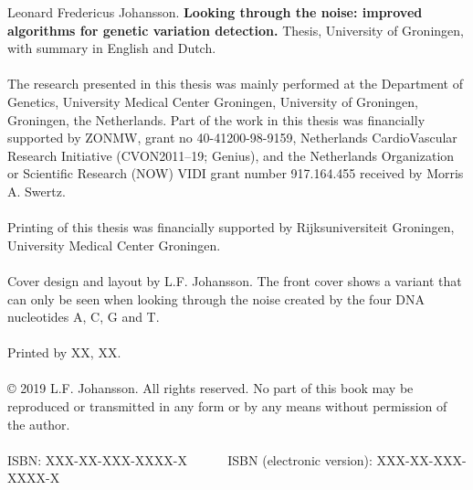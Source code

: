 {\small
\noindent
Leonard Fredericus Johansson. \textbf{Looking through the noise: improved algorithms for genetic variation detection.} Thesis, University of Groningen, with summary in English and Dutch.
\\~\\
The research presented in this thesis was mainly performed at the Department of Genetics, University Medical Center Groningen, University of Groningen, Groningen, the Netherlands. Part of the work in this thesis was financially supported by ZONMW, grant no 40-41200-98-9159, Netherlands CardioVascular Research Initiative (CVON2011–19; Genius), and the Netherlands Organization or Scientific Research (NOW) VIDI grant number 917.164.455 received by Morris A. Swertz. 
\\~\\
Printing of this thesis was financially supported by Rijksuniversiteit Groningen, University Medical Center Groningen. 
\\~\\
Cover design and layout by L.F. Johansson.
The front cover shows a variant that can only be seen when looking through the noise created by the four DNA nucleotides A, C, G and T. 
\\~\\
Printed by XX, XX.\\
\\
© 2019 L.F. Johansson. All rights reserved. No part of this book may be reproduced or transmitted in any form or by any means without permission of the author.\\
\\
ISBN: XXX-XX-XXX-XXXX-X \mbox{~~~~~} ISBN (electronic version): XXX-XX-XXX-XXXX-X
}


